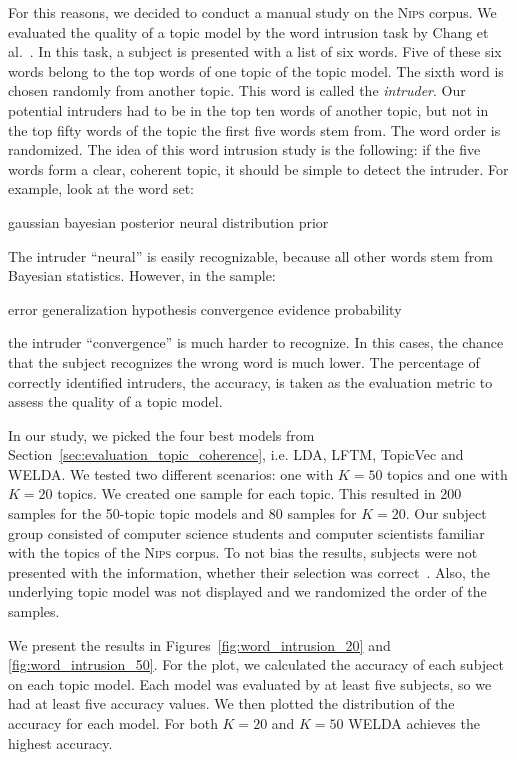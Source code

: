 \documentclass[
        a4paper,
        titlepage,
        twoside,
        parskip,
        numbers=noenddot
        ]{scrbook}
\newcommand{\topicbox}[1]{
  \setlength{\OuterFrameSep}{0pt}
  \begin{framed}
    #1
  \end{framed}
}
\theoremstyle{break}
\begin{document}
For this reasons, we decided to conduct a manual study on the \textsc{Nips} corpus.
We evaluated the quality of a topic model by the word intrusion task by Chang et al.~\cite{Chang2009}.
In this task, a subject is presented with a list of six words.
Five of these six words belong to the top words of one topic of the topic model.
The sixth word is chosen randomly from another topic.
This word is called the \emph{intruder}.
Our potential intruders had to be in the top ten words of another topic, but not in the top fifty words of the topic the first five words stem from.
The word order is randomized.
The idea of this word intrusion study is the following: if the five words form a clear, coherent topic, it should be simple to detect the intruder.
For example, look at the word set:
\topicbox{gaussian bayesian posterior neural distribution prior}
The intruder ``neural'' is easily recognizable, because all other words stem from Bayesian statistics.
However, in the sample:
\topicbox{error generalization hypothesis convergence evidence probability}
the intruder ``convergence'' is much harder to recognize.
In this cases, the chance that the subject recognizes the wrong word is much lower.
The percentage of correctly identified intruders, the accuracy, is taken as the evaluation metric to assess the quality of a topic model.

In our study, we picked the four best models from Section~\ref{sec:evaluation_topic_coherence}, i.e. LDA, LFTM, TopicVec and WELDA.
We tested two different scenarios: one with $K = 50$ topics and one with $K = 20$ topics.
We created one sample for each topic.
This resulted in 200 samples for the 50-topic topic models and 80 samples for $K = 20$.
Our subject group consisted of computer science students and computer scientists familiar with the topics of the \textsc{Nips} corpus.
To not bias the results, subjects were not presented with the information, whether their selection was correct~\cite{Chang2009}.
Also, the underlying topic model was not displayed and we randomized the order of the samples.

We present the results in Figures~\ref{fig:word_intrusion_20} and \ref{fig:word_intrusion_50}.
For the plot, we calculated the accuracy of each subject on each topic model.
Each model was evaluated by at least five subjects, so we had at least five accuracy values.
We then plotted the distribution of the accuracy for each model.
For both $K = 20$ and $K = 50$ WELDA achieves the highest accuracy.
\end{document}
